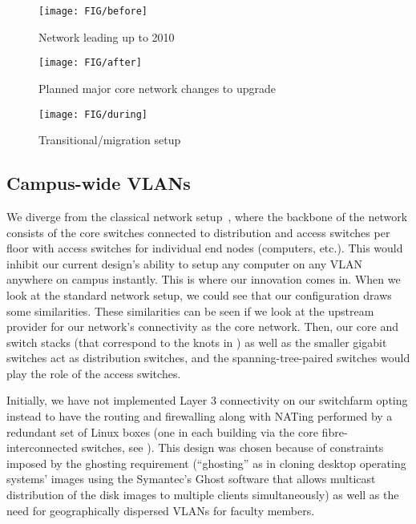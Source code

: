 \begin{figure}[htp!]
	\centering
	\texttt{[image: FIG/before]}
	\caption{Network leading up to 2010}
	\label{fig:before}
\end{figure}

\begin{figure}[htp!]
	\centering
	\texttt{[image: FIG/after]}
	\caption{Planned major core network changes to upgrade}
	\label{fig:after}
\end{figure}

\begin{figure}[htp!]
	\centering
	\texttt{[image: FIG/during]}
	\caption{Transitional/migration setup}
	\label{fig:during}
\end{figure}

\subsection{Campus-wide VLANs}
\label{sect:campus-vlans}

We diverge from the classical {\cisco} network setup~\cite{cisco-lan-switching-99}, where
the backbone of the network consists of the core switches connected to distribution
and access switches per floor with access switches for individual end nodes (computers, etc.).
This would inhibit our
current design's ability to setup any computer on
any VLAN anywhere on campus instantly. This is where our innovation comes in.
When we look at the standard {\cisco} network setup, we could see
that our configuration draws some similarities.
These similarities can be seen if we look at
the upstream provider for our network's
connectivity
as the core network.
Then, our core {\BigSwitchOne} and {\BigSwitchTwo}
switch stacks 
(that correspond to the knots in )
as well as
the smaller gigabit switches act as distribution switches, and
the spanning-tree-paired switches would play the role of the access switches.

Initially, we have not implemented Layer 3 connectivity on our
switchfarm opting instead to have the routing and
firewalling along with NATing performed by a redundant set
of Linux boxes (one in each building via
the core fibre-interconnected switches, see ).
This design was chosen because of constraints imposed
by the ghosting requirement (``ghosting'' as in cloning desktop
operating systems' images using the Symantec's Ghost software
that allows multicast distribution of the disk images to multiple
clients simultaneously) as well as the need for
geographically dispersed VLANs for faculty members.

